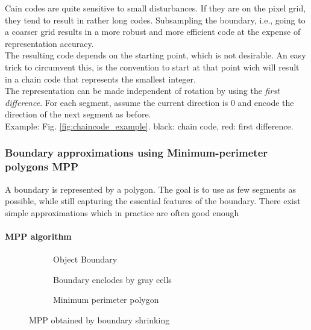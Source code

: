 Cain codes are quite sensitive to small disturbances. If they are on the pixel grid, they tend to result in rather long codes. Subsampling the boundary, i.e., going to a coarser grid results in a more robust and more efficient code at the expense of representation accuracy.\\
The resulting code depends on the starting point, which is not desirable. An easy trick to circumvent this, is the convention to start at that point wich will result in a chain code that represents the smallest integer.\\

The representation can be made independent of rotation by using the \emph{first difference}.
For each segment, assume the current direction is 0 and encode the direction of the next segment as before. \\
Example: Fig. \ref{fig:chaincode_example}. black: chain code, red: first difference.

\subsubsection{Boundary approximations using Minimum-perimeter polygons MPP}
A boundary is represented by a polygon. The goal is to use as few segments as possible, while still capturing the essential features of the boundary. There exist simple approximations which in practice are often good enough\\
\paragraph{MPP algorithm}
\begin{figure}[h]
	\centering
	\begin{subfigure}[b]{0.3\textwidth}
		\centering
		\caption{Object Boundary}
	\end{subfigure}
	\begin{subfigure}[b]{0.3\textwidth}
		\centering
		\caption{Boundary enclodes by gray cells}
	\end{subfigure}
	\begin{subfigure}[b]{0.3\textwidth}
		\centering
		\caption{Minimum perimeter polygon}
	\end{subfigure}
	\caption{MPP obtained by boundary shrinking}
\end{figure}

